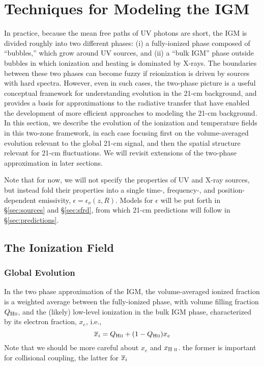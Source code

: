\section{Techniques for Modeling the IGM} \label{sec:techniques}
In practice, because the mean free paths of UV photons are short, the IGM is divided roughly into two different phases: (i) a fully-ionized phase composed of ``bubbles,'' which grow around UV sources, and (ii) a ``bulk IGM'' phase outside bubbles in which ionization and heating is dominated by X-rays. The boundaries between these two phases can become fuzzy if reionization is driven by sources with hard spectra. However, even in such cases, the two-phase picture is a useful conceptual framework for understanding evolution in the 21-cm background, and provides a basis for approximations to the radiative transfer that have enabled the development of more efficient approaches to modeling the 21-cm background. In this section, we describe the evolution of the ionization and temperature fields in this two-zone framework, in each case focusing first on the volume-averaged evolution relevant to the global 21-cm signal, and then the spatial structure relevant for 21-cm fluctuations. We will revisit extensions of the two-phase approximation in later sections.

Note that for now, we will not specify the properties of UV and X-ray sources, but instead fold their properties into a single time-, frequency-, and position-dependent emissivity, $\epsilon = \epsilon_{\nu}(z,R)$. Models for $\epsilon$ will be put forth in \S\ref{sec:sources} and \S\ref{sec:sfrd}, from which 21-cm predictions will follow in \S\ref{sec:predictions}. 

\subsection{The Ionization Field}

\subsubsection{Global Evolution} \label{sec:ionization_global}
In the two phase approximation of the IGM, the volume-averaged ionized fraction is a weighted average between the fully-ionized phase, with volume filling fraction $Q_{\text{H} {\textsc{ii}}}$, and the (likely) low-level ionization in the bulk IGM phase, characterized by its electron fraction, $x_e$, i.e.,
\begin{equation}
	\overline{x}_i = Q_{\text{H} {\textsc{ii}}} + (1 - Q_{\text{H} {\textsc{ii}}}) x_e
\end{equation}
{\color{red} Note that we should be more careful about $x_e$ and $x_{\text{H } \textsc{ii}}$. the former is important for collisional coupling, the latter for $\overline{x}_i$} 

